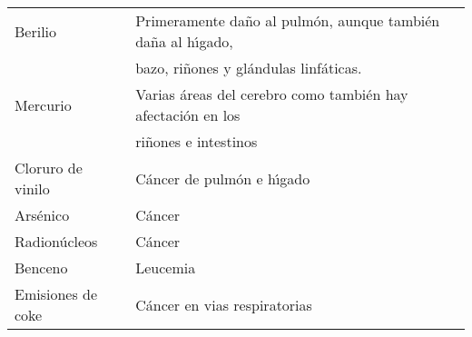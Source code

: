 \begin{table}[htdp]
\begin{center}
{\begin{tabular}{|l|l|}
Berilio  & Primeramente da\~no al pulm\'on, aunque tambi\'en da\~na al h\'{\i}gado,\\ \index{berilio!efectos a la salud}
             &  bazo, ri\~nones y gl\'andulas linf\'aticas.\\ \index{higado@h\'{\i}gado}
Mercurio& Varias \'areas del cerebro como tambi\'en hay afectaci\'on en los \\
                & ri\~nones e intestinos\\ \index{mercurio!efectos a la salud}
Cloruro de vinilo& C\'ancer de pulm\'on e h\'{\i}gado\\ \index{vinilo! cloruro de}
Ars\'enico & C\'ancer\\ \index{arsenico@ars\'enico!efectos a la salud}
Radion\'ucleos& C\'ancer\\ \index{radionucleos@radion\'ucleos!efectos a la salud}
Benceno & Leucemia\\ \index{benceno!efectos a la salud}
Emisiones de coke & C\'ancer en vias respiratorias\\ \hline
\end{tabular}}
\end{center}
\label{efectos}
\end{table}%

\clearpage

 
